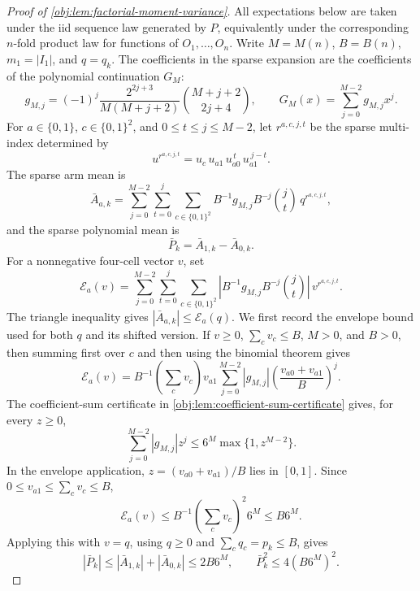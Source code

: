 \begin{proof}[Proof of \cref{obj:lem:factorial-moment-variance}]
All expectations below are taken under the iid sequence law generated by \(P\), equivalently under the corresponding \(n\)-fold product law for functions of \(O_1,\ldots,O_n\). Write \(M=M(n)\), \(B=B(n)\), \(m_1=|I_1|\), and \(q=q_k\). The coefficients in the sparse expansion are the coefficients of the polynomial continuation \(G_M\):
\[
g_{M,j}=(-1)^j\frac{2^{2j+3}}{M(M+j+2)}\binom{M+j+2}{2j+4},
\qquad
G_M(x)=\sum_{j=0}^{M-2} g_{M,j}x^j .
\]
For \(a\in\{0,1\}\), \(c\in\{0,1\}^2\), and \(0\le t\le j\le M-2\), let \(r^{a,c,j,t}\) be the sparse multi-index determined by
\[
u^{r^{a,c,j,t}}=u_c\,u_{a1}\,u_{a0}^{\,t}\,u_{a1}^{\,j-t}.
\]
The sparse arm mean is
\[
\bar A_{a,k}
=
\sum_{j=0}^{M-2}\sum_{t=0}^{j}\sum_{c\in\{0,1\}^2}
B^{-1}g_{M,j}B^{-j}\binom jt\,q^{r^{a,c,j,t}},
\]
and the sparse polynomial mean is
\[
\bar P_k=\bar A_{1,k}-\bar A_{0,k}.
\]
For a nonnegative four-cell vector \(v\), set
\[
\mathcal E_a(v)
=
\sum_{j=0}^{M-2}\sum_{t=0}^{j}\sum_{c\in\{0,1\}^2}
\left|B^{-1}g_{M,j}B^{-j}\binom jt\right|\,v^{r^{a,c,j,t}}.
\]
The triangle inequality gives \(|\bar A_{a,k}|\le \mathcal E_a(q)\). We first record the envelope bound used for both \(q\) and its shifted version. If \(v\ge0\), \(\sum_c v_c\le B\), \(M>0\), and \(B>0\), then summing first over \(c\) and then using the binomial theorem gives
\[
\mathcal E_a(v)
= B^{-1}\left(\sum_c v_c\right)v_{a1}
\sum_{j=0}^{M-2}|g_{M,j}|
\left(\frac{v_{a0}+v_{a1}}{B}\right)^j .
\]
The coefficient-sum certificate in \cref{obj:lem:coefficient-sum-certificate} gives, for every \(z\ge0\),
\[
\sum_{j=0}^{M-2}|g_{M,j}|z^j
\le 6^M\max\{1,z^{M-2}\}.
\]
In the envelope application, \(z=(v_{a0}+v_{a1})/B\) lies in \([0,1]\). Since \(0\le v_{a1}\le \sum_c v_c\le B\),
\[
\mathcal E_a(v)
\le B^{-1}\left(\sum_c v_c\right)^2 6^M
\le B6^M .
\]
Applying this with \(v=q\), using \(q\ge0\) and \(\sum_c q_c=p_k\le B\), gives
\[
|\bar P_k|
\le |\bar A_{1,k}|+|\bar A_{0,k}|
\le 2B6^M,
\qquad
\bar P_k^2\le4(B6^M)^2.
\]


\end{proof}

